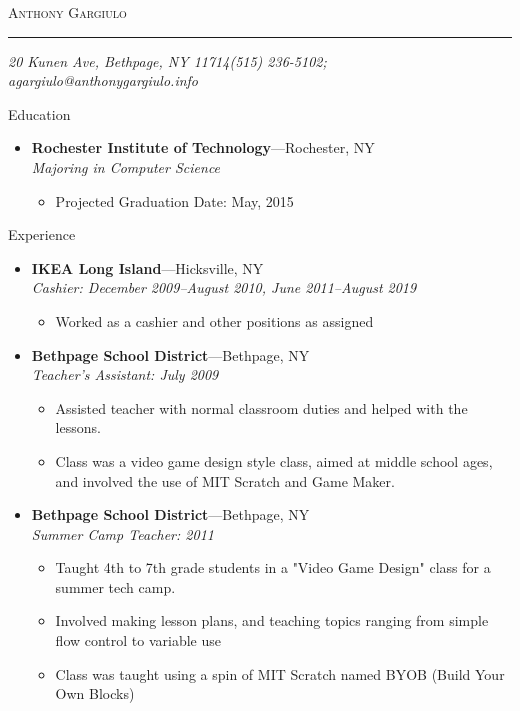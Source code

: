 \documentclass[11pt,oneside]{article}
\makeatletter
\newcommand{\name}{Anthony Gargiulo}
\newcommand{\addr}{20 Kunen Ave, Bethpage, NY 11714}
\newcommand{\phone}{(515) 236-5102}
\newcommand{\email}{agargiulo@anthonygargiulo.info}
\newcommand{\bigname}[1]{
	\begin{center}\fontfamily{phv}\selectfont\Huge\scshape#1\end{center}
}
\newenvironment{ressection}[1]{
	\vspace{4pt}
	{\fontfamily{phv}\selectfont\Large#1}
	\begin{itemize}
	\vspace{3pt}
}{
	\end{itemize}
}
\newcommand{\ressubitem}[1]{
	\vspace{-1pt}
	\item \begin{flushleft} #1 \end{flushleft}
}
\newcommand{\resbigitem}[3]{
	\vspace{-5pt}
	\item
	\textbf{#1}---#2 \\
	\textit{#3}
}
\newenvironment{ressubsec}[3]{
	\resbigitem{#1}{#2}{#3}
	\vspace{-2pt}
	\begin{itemize}
}{
	\end{itemize}
}
\makeatother
\begin{document}
 \selectfont

\bigname{\name}

\vspace{-8pt} \rule{\textwidth}{1pt}

\vspace{-1pt} {\small\itshape \addr \hfill \phone; \email}

\vspace{8 pt}




\begin{ressection}{Education}

	\begin{ressubsec}{Rochester Institute of Technology}{Rochester, NY}{Majoring in Computer Science}
		\ressubitem{Projected Graduation Date: May, 2015}
	\end{ressubsec}

\end{ressection}


\begin{ressection}{Experience}

	\begin{ressubsec}{IKEA Long Island}{Hicksville, NY}{Cashier: December 2009--August 2010, June 2011--August 2019}
		\ressubitem{Worked as a cashier and other positions as assigned}
	\end{ressubsec}

	\begin{ressubsec}{Bethpage School District}{Bethpage, NY}{Teacher's Assistant: July 2009}
		\ressubitem{Assisted teacher with normal classroom duties and helped with the lessons.}
		\ressubitem{Class was a video game design style class, aimed at middle school ages, and involved the use of MIT Scratch and Game Maker.}
	\end{ressubsec}

	\begin{ressubsec}{Bethpage School District}{Bethpage, NY}{Summer Camp Teacher: 2011}
		\ressubitem{Taught 4th to 7th grade students in a "Video Game Design" class for a summer tech camp.}
		\ressubitem{Involved making lesson plans, and teaching topics ranging from simple flow control to variable use}
		\ressubitem{Class was taught using a spin of MIT Scratch named BYOB (Build Your Own Blocks)}
	\end{ressubsec}

\end{ressection}
\end{document}
